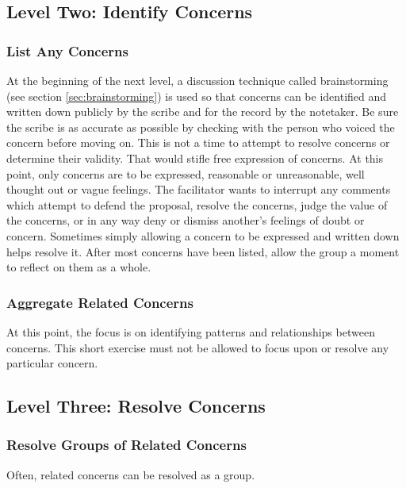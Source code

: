 \subsection*{Level Two: Identify Concerns}

\subsubsection*{List Any Concerns}

At the beginning of the next level, a discussion technique called brainstorming (see section \ref{sec:brainstorming}) is used so that concerns can be identified and written down publicly by the scribe and for the record by the notetaker. Be sure the scribe is as accurate as possible by checking with the person who voiced the concern before moving on. This is not a time to attempt to resolve concerns or determine their validity. That would stifle free expression of concerns. At this point, only concerns are to be expressed, reasonable or unreasonable, well thought out or vague feelings. The facilitator wants to interrupt any comments which attempt to defend the proposal, resolve the concerns, judge the value of the concerns, or in any way deny or dismiss another's feelings of doubt or concern. Sometimes simply allowing a concern to be expressed and written down helps resolve it. After most concerns have been listed, allow the group a moment to reflect on them as a whole.

\subsubsection*{Aggregate Related Concerns}

At this point, the focus is on identifying patterns and relationships between concerns. This short exercise must not be allowed to focus upon or resolve any particular concern.

\subsection*{Level Three: Resolve Concerns}

\subsubsection*{Resolve Groups of Related Concerns}

Often, related concerns can be resolved as a group.

